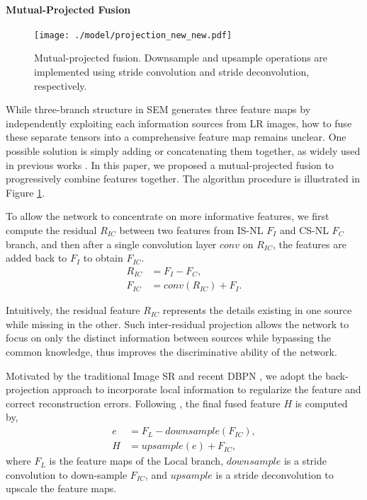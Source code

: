 \documentclass[10pt,twocolumn,letterpaper]{article}
\begin{document}
\paragraph{Mutual-Projected Fusion}
\begin{figure}[t]
	\centering
		\texttt{[image: ./model/projection\_new\_new.pdf]}
	\caption{Mutual-projected fusion. Downsample and upsample operations are implemented using stride convolution and stride deconvolution, respectively.}
	\label{fig:fusion}
\end{figure}
While three-branch structure in SEM generates three feature maps by independently exploiting each information sources from LR images, how to fuse these separate tensors into a comprehensive feature map remains unclear. One possible solution is simply adding or concatenating them together, as widely used in previous works \cite{lim2017enhanced,liu2018non,zhang2019residual,zhang2018residual}. In this paper, we proposed a mutual-projected fusion to progressively combine features together. The algorithm procedure is illustrated in Figure \ref{fig:fusion}.







To allow the network to concentrate on more informative features, we first compute the residual $R_{IC}$ between two features from IS-NL $F_I$ and CS-NL $F_C$ branch, and then after a single convolution layer $conv$ on $R_{IC}$, the features are added back to $F_I$ to obtain $F_{IC}$.
\begin{align}
    R_{IC} &= F_I - F_C,\\
    F_{IC} &= conv(R_{IC}) + F_I.
\end{align}


Intuitively, the residual feature $R_{IC}$ represents the details existing in one source while missing in the other. Such inter-residual projection allows the network to focus on only the distinct information between sources while bypassing the common knowledge, thus improves the discriminative ability of the network.





Motivated by the traditional Image SR and recent DBPN \cite{haris2018deep}, we adopt the back-projection approach to incorporate local information to regularize the feature and correct reconstruction errors. Following \cite{haris2018deep}, the final fused feature $H$ is computed by,
\begin{align}
    e &= F_L - downsample(F_{IC}), \\
    H &= upsample(e) + F_{IC},
\end{align}
where $F_L$ is the feature maps of the Local branch, $downsample$ is a stride convolution to down-sample $F_{IC}$, and $upsample$ is a stride deconvolution to upscale the feature maps.
\end{document}
